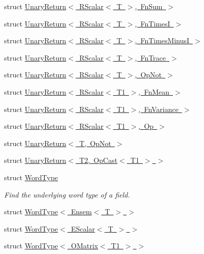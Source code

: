 \begin{DoxyCompactItemize}
struct \mbox{\hyperlink{structENSEM_1_1UnaryReturn_3_01RScalar_3_01T_01_4_00_01FnSum_01_4}{Unary\+Return$<$ R\+Scalar$<$ T $>$, Fn\+Sum $>$}}
\item 
struct \mbox{\hyperlink{structENSEM_1_1UnaryReturn_3_01RScalar_3_01T_01_4_00_01FnTimesI_01_4}{Unary\+Return$<$ R\+Scalar$<$ T $>$, Fn\+Times\+I $>$}}
\item 
struct \mbox{\hyperlink{structENSEM_1_1UnaryReturn_3_01RScalar_3_01T_01_4_00_01FnTimesMinusI_01_4}{Unary\+Return$<$ R\+Scalar$<$ T $>$, Fn\+Times\+Minus\+I $>$}}
\item 
struct \mbox{\hyperlink{structENSEM_1_1UnaryReturn_3_01RScalar_3_01T_01_4_00_01FnTrace_01_4}{Unary\+Return$<$ R\+Scalar$<$ T $>$, Fn\+Trace $>$}}
\item 
struct \mbox{\hyperlink{structENSEM_1_1UnaryReturn_3_01RScalar_3_01T_01_4_00_01OpNot_01_4}{Unary\+Return$<$ R\+Scalar$<$ T $>$, Op\+Not $>$}}
\item 
struct \mbox{\hyperlink{structENSEM_1_1UnaryReturn_3_01RScalar_3_01T1_01_4_00_01FnMean_01_4}{Unary\+Return$<$ R\+Scalar$<$ T1 $>$, Fn\+Mean $>$}}
\item 
struct \mbox{\hyperlink{structENSEM_1_1UnaryReturn_3_01RScalar_3_01T1_01_4_00_01FnVariance_01_4}{Unary\+Return$<$ R\+Scalar$<$ T1 $>$, Fn\+Variance $>$}}
\item 
struct \mbox{\hyperlink{structENSEM_1_1UnaryReturn_3_01RScalar_3_01T1_01_4_00_01Op_01_4}{Unary\+Return$<$ R\+Scalar$<$ T1 $>$, Op $>$}}
\item 
struct \mbox{\hyperlink{structENSEM_1_1UnaryReturn_3_01T_00_01OpNot_01_4}{Unary\+Return$<$ T, Op\+Not $>$}}
\item 
struct \mbox{\hyperlink{structENSEM_1_1UnaryReturn_3_01T2_00_01OpCast_3_01T1_01_4_01_4}{Unary\+Return$<$ T2, Op\+Cast$<$ T1 $>$ $>$}}
\item 
struct \mbox{\hyperlink{structENSEM_1_1WordType}{Word\+Type}}
\begin{DoxyCompactList}\small\item\em Find the underlying word type of a field. \end{DoxyCompactList}\item 
struct \mbox{\hyperlink{structENSEM_1_1WordType_3_01Ensem_3_01T_01_4_01_4}{Word\+Type$<$ Ensem$<$ T $>$ $>$}}
\item 
struct \mbox{\hyperlink{structENSEM_1_1WordType_3_01EScalar_3_01T_01_4_01_4}{Word\+Type$<$ E\+Scalar$<$ T $>$ $>$}}
\item 
struct \mbox{\hyperlink{structENSEM_1_1WordType_3_01OMatrix_3_01T1_01_4_01_4}{Word\+Type$<$ O\+Matrix$<$ T1 $>$ $>$}}

\end{DoxyCompactItemize}
